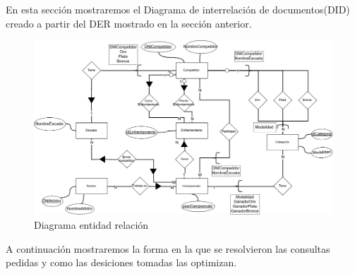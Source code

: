 En esta sección mostraremos el Diagrama de interrelación de documentos(DID) creado a partir del DER mostrado en la sección
anterior.

\begin{figure}[H]
  \centering
    \includegraphics[scale=0.4]{imagenes/DID.png}
  \caption{Diagrama entidad relación}
\end{figure}

A continuación mostraremos la forma en la que se resolvieron las consultas pedidas y como las desiciones tomadas las
optimizan.

